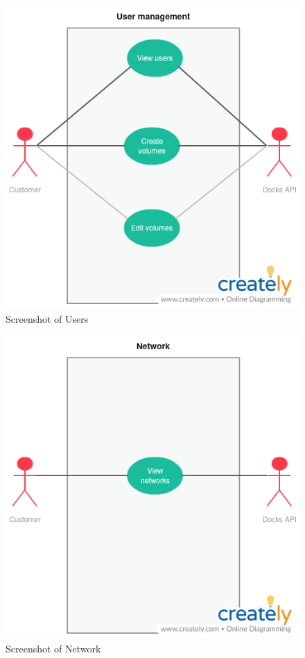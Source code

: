 \documentclass[]{article}
\begin{document}
\begin{figure}[H]
	\centering
	\includegraphics[scale=0.5]{uml/users.png}
	\caption{Screenshot of Users}
\end{figure}

\begin{figure}[H]
	\centering
	\includegraphics[scale=0.5]{uml/networks.png}
	\caption{Screenshot of Network}
\end{figure}
\end{document}
